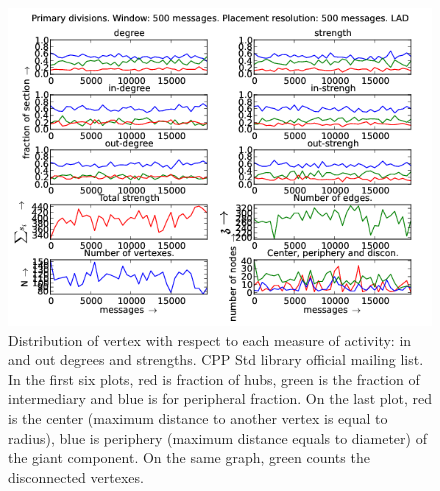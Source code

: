 \documentclass[%
 aip,
 jmp,%
 amsmath,amssymb,
 reprint,%
]{revtex4-1}
\begin{document}
\begin{figure}[hbtp] 
   \centering
        \includegraphics[width=\textwidth]{figs/LAD/500}
    \caption{Distribution of vertex with respect to each measure of activity: in and out degrees and strengths. CPP Std library official mailing list. In the first six plots, red is fraction of hubs, green is the fraction of intermediary and blue is for peripheral fraction. On the last plot, red is the center (maximum distance to another vertex is equal to radius), blue is periphery (maximum distance equals to diameter) of the giant component. On the same graph, green counts the disconnected vertexes.}
    \label{fig:lad500}
\end{figure}
\end{document}
